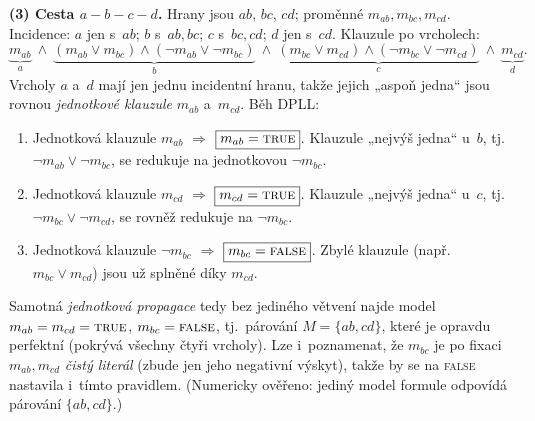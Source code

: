 \begin{priklad}
\textbf{(3) Cesta $a\!-\!b\!-\!c\!-\!d$.} Hrany jsou $ab$, $bc$, $cd$; proměnné $m_{ab},m_{bc},m_{cd}$. Incidence: $a$ jen s~$ab$; $b$ s~$ab,bc$; $c$ s~$bc,cd$; $d$ jen s~$cd$. Klauzule po vrcholech:
\[
\underbrace{m_{ab}}_{a}\ \wedge\ \underbrace{(m_{ab}\vee m_{bc})\wedge(\neg m_{ab}\vee\neg m_{bc})}_{b}\ \wedge\ \underbrace{(m_{bc}\vee m_{cd})\wedge(\neg m_{bc}\vee\neg m_{cd})}_{c}\ \wedge\ \underbrace{m_{cd}}_{d}.
\]
Vrcholy $a$ a~$d$ mají jen jednu incidentní hranu, takže jejich „aspoň jedna`` jsou rovnou \emph{jednotkové klauzule} $m_{ab}$ a~$m_{cd}$. Běh DPLL:
\begin{enumerate}
  \item Jednotková klauzule $m_{ab}$ $\Rightarrow$ $\boxed{m_{ab}=\textsc{true}}$. Klauzule „nejvýš jedna`` u~$b$, tj.\ $\neg m_{ab}\vee\neg m_{bc}$, se redukuje na jednotkovou $\neg m_{bc}$.
  \item Jednotková klauzule $m_{cd}$ $\Rightarrow$ $\boxed{m_{cd}=\textsc{true}}$. Klauzule „nejvýš jedna`` u~$c$, tj.\ $\neg m_{bc}\vee\neg m_{cd}$, se rovněž redukuje na $\neg m_{bc}$.
  \item Jednotková klauzule $\neg m_{bc}$ $\Rightarrow$ $\boxed{m_{bc}=\textsc{false}}$. Zbylé klauzule (např.\ $m_{bc}\vee m_{cd}$) jsou už splněné díky $m_{cd}$.
\end{enumerate}
Samotná \emph{jednotková propagace} tedy bez jediného větvení najde model $m_{ab}=m_{cd}=\textsc{true}$, $m_{bc}=\textsc{false}$, tj.\ párování $\boxed{M=\{ab,cd\}}$, které je opravdu perfektní (pokrývá všechny čtyři vrcholy). Lze i~poznamenat, že $m_{bc}$ je po fixaci $m_{ab},m_{cd}$ \emph{čistý literál} (zbude jen jeho negativní výskyt), takže by se na \textsc{false} nastavila i~tímto pravidlem. (Numericky ověřeno: jediný model formule odpovídá párování $\{ab,cd\}$.)

\begin{center}
\end{center}
\end{priklad}

